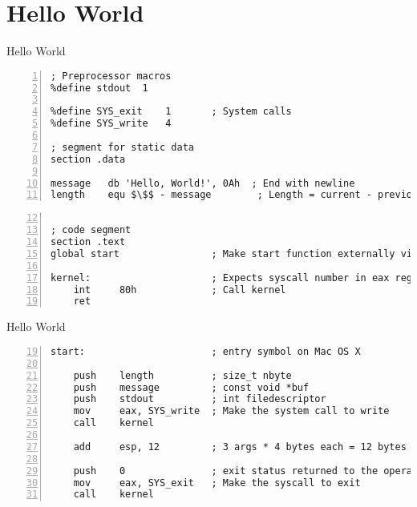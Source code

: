 \section{Hello World}

\begin{frame}[fragile]{Hello World}
\begin{lstlisting}[numbers=left,caption=Makros und Datensegment]
; Preprocessor macros
%define stdout  1

%define SYS_exit    1       ; System calls
%define SYS_write   4

; segment for static data
section .data

message   db 'Hello, World!', 0Ah  ; End with newline
length    equ $\$$ - message        ; Length = current - previous address
\end{lstlisting}

\begin{lstlisting}[numbers=left,firstnumber=12,caption=Codesegment - Syscall]

; code segment
section .text
global start                ; Make start function externally visible for linker

kernel:                     ; Expects syscall number in eax register
    int     80h             ; Call kernel
    ret
\end{lstlisting}

\end{frame}

\begin{frame}[fragile]{Hello World}
\begin{lstlisting}[numbers=left,firstnumber=19,caption=Codesegment - Hauptprogramm]
start:                      ; entry symbol on Mac OS X

    push    length          ; size_t nbyte
    push    message         ; const void *buf
    push    stdout          ; int filedescriptor
    mov     eax, SYS_write  ; Make the system call to write
    call    kernel

    add     esp, 12         ; 3 args * 4 bytes each = 12 bytes

    push    0               ; exit status returned to the operating system
    mov     eax, SYS_exit   ; Make the syscall to exit
    call    kernel
\end{lstlisting}
\end{frame}
